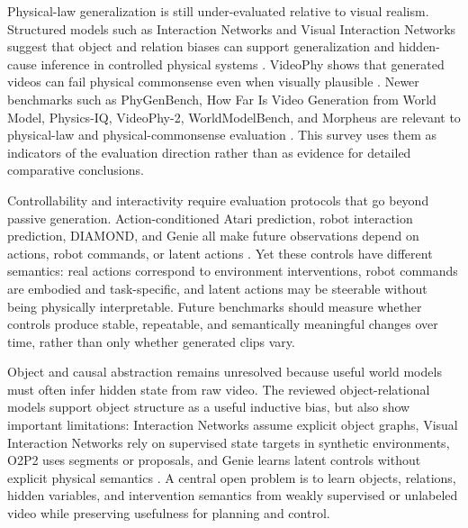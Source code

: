 Physical-law generalization is still under-evaluated relative to visual realism. Structured models such as Interaction Networks and Visual Interaction Networks suggest that object and relation biases can support generalization and hidden-cause inference in controlled physical systems \cite{battaglia2016_interaction_networks_prov,watters2017_visual_interaction_networks_prov}. VideoPhy shows that generated videos can fail physical commonsense even when visually plausible \cite{bansal2025_videophy_prov}. Newer benchmarks such as PhyGenBench, How Far Is Video Generation from World Model, Physics-IQ, VideoPhy-2, WorldModelBench, and Morpheus are relevant to physical-law and physical-commonsense evaluation \cite{meng2025_phygenbench_prov,kang2025_physical_law_perspective_prov,motamed2025_physics_iq_prov,bansal2025videophy2_prov,li2025worldmodelbench_prov,zhang2025morpheus_prov}. This survey uses them as indicators of the evaluation direction rather than as evidence for detailed comparative conclusions.

Controllability and interactivity require evaluation protocols that go beyond passive generation. Action-conditioned Atari prediction, robot interaction prediction, DIAMOND, and Genie all make future observations depend on actions, robot commands, or latent actions \cite{oh2015_action_conditional_video_prediction_prov,finn2016_physical_interaction_video_prediction_prov,alonso2024_diamond_prov,bruce2024_genie_prov}. Yet these controls have different semantics: real actions correspond to environment interventions, robot commands are embodied and task-specific, and latent actions may be steerable without being physically interpretable. Future benchmarks should measure whether controls produce stable, repeatable, and semantically meaningful changes over time, rather than only whether generated clips vary.

Object and causal abstraction remains unresolved because useful world models must often infer hidden state from raw video. The reviewed object-relational models support object structure as a useful inductive bias, but also show important limitations: Interaction Networks assume explicit object graphs, Visual Interaction Networks rely on supervised state targets in synthetic environments, O2P2 uses segments or proposals, and Genie learns latent controls without explicit physical semantics \cite{battaglia2016_interaction_networks_prov,watters2017_visual_interaction_networks_prov,janner2019_o2p2_prov,bruce2024_genie_prov}. A central open problem is to learn objects, relations, hidden variables, and intervention semantics from weakly supervised or unlabeled video while preserving usefulness for planning and control.

